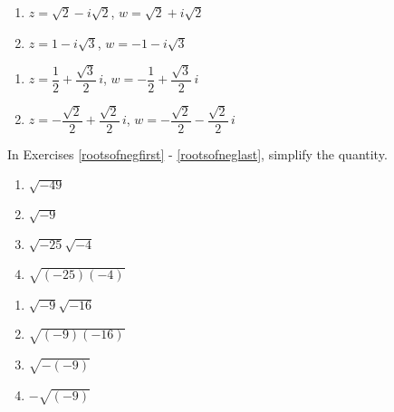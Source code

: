 \documentclass[10pt]{article}
\begin{document}
\begin{multicols}{2}
\begin{enumerate}
\setcounter{enumi}{\value{HW}}

\item  $z = \sqrt{2} - i\sqrt{2}$, $w = \sqrt{2} + i\sqrt{2}$
\item  $z = 1 - i\sqrt{3}$, $w = -1 - i\sqrt{3}$

\setcounter{HW}{\value{enumi}}
\end{enumerate}
\end{multicols}

\begin{multicols}{2}
\begin{enumerate}
\setcounter{enumi}{\value{HW}}

\item  $z = \dfrac{1}{2} + \dfrac{\sqrt{3}}{2} \, i$, $w = -\dfrac{1}{2} + \dfrac{\sqrt{3}}{2} \,i$
\item  $z = -\dfrac{\sqrt{2}}{2} + \dfrac{\sqrt{2}}{2} \, i$, $w = -\dfrac{\sqrt{2}}{2} - \dfrac{\sqrt{2}}{2} \, i$ \label{compnumbasiclast}

\setcounter{HW}{\value{enumi}}
\end{enumerate}
\end{multicols}

In Exercises \ref{rootsofnegfirst} - \ref{rootsofneglast}, simplify the quantity.

\begin{multicols}{4}
\begin{enumerate}
\setcounter{enumi}{\value{HW}}

\item $\sqrt{-49}$ \label{rootsofnegfirst}
\item $\sqrt{-9}$
\item $\sqrt{-25}\sqrt{-4}$
\item $\sqrt{(-25)(-4)}$

\setcounter{HW}{\value{enumi}}
\end{enumerate}
\end{multicols}

\begin{multicols}{4}
\begin{enumerate}
\setcounter{enumi}{\value{HW}}

\item $\sqrt{-9}\sqrt{-16}$
\item $\sqrt{(-9)(-16)}$
\item $\sqrt{-(-9)}$
\item $-\sqrt{(-9)}$ \label{rootsofneglast}

\setcounter{HW}{\value{enumi}}
\end{enumerate}
\end{multicols}
\end{document}
